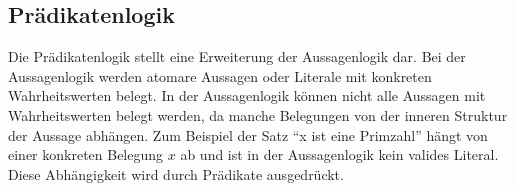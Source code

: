 









\subsection{Prädikatenlogik}
Die Prädikatenlogik stellt eine Erweiterung der Aussagenlogik dar.
Bei der Aussagenlogik werden atomare Aussagen oder Literale mit konkreten
Wahrheitswerten belegt. In der Aussagenlogik können nicht alle Aussagen
mit Wahrheitswerten belegt werden, da manche Belegungen von der inneren
Struktur der Aussage abhängen. Zum Beispiel der Satz "`x ist eine Primzahl"'
hängt von einer konkreten Belegung $x$ ab und ist in der Aussagenlogik kein
valides Literal. Diese Abhängigkeit wird durch Prädikate ausgedrückt.~\cite{heinemann2013logik}

